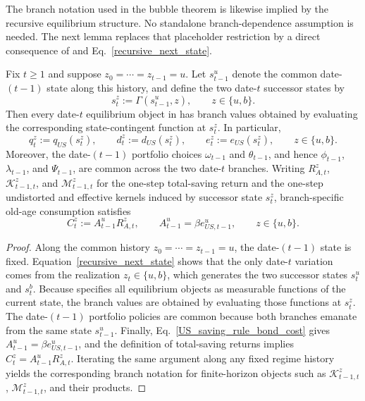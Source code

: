 \documentclass{article}
\begin{document}
The branch notation used in the bubble theorem is likewise implied by the recursive equilibrium structure. No standalone branch-dependence assumption is needed. The next lemma replaces that placeholder restriction by a direct consequence of  and Eq.~\eqref{recursive_next_state}.

\begin{lem}\label{lem_branch_reduction}\label{ass_switch_dependence}
Fix $t\ge 1$ and suppose $z_0=\cdots=z_{t-1}=u$. Let $s_{t-1}^u$ denote the common date-$(t-1)$ state along this history, and define the two date-$t$ successor states by
\[
s_t^z:=\Gamma(s_{t-1}^u,z),
\qquad
z\in\{u,b\}.
\]
Then every date-$t$ equilibrium object in  has branch values obtained by evaluating the corresponding state-contingent function at $s_t^z$. In particular,
\[
q_t^z:=q_{US}(s_t^z),
\qquad
d_t^z:=d_{US}(s_t^z),
\qquad
e_t^z:=e_{US}(s_t^z),
\qquad
z\in\{u,b\}.
\]
Moreover, the date-$(t-1)$ portfolio choices $\omega_{t-1}$ and $\theta_{t-1}$, and hence $\phi_{t-1}$, $\lambda_{t-1}$, and $\Psi_{t-1}$, are common across the two date-$t$ branches. Writing $R_{A,t}^z$, $\mathcal K_{t-1,t}^z$, and $\mathcal M_{t-1,t}^z$ for the one-step total-saving return and the one-step undistorted and effective kernels induced by successor state $s_t^z$, branch-specific old-age consumption satisfies
\[
C_t^z:=A_{t-1}^uR_{A,t}^z,
\qquad
A_{t-1}^u=\beta e_{US,t-1}^u,
\qquad
z\in\{u,b\}.
\]
\end{lem}

\begin{proof}
Along the common history $z_0=\cdots=z_{t-1}=u$, the date-$(t-1)$ state is fixed. Equation~\eqref{recursive_next_state} shows that the only date-$t$ variation comes from the realization $z_t\in\{u,b\}$, which generates the two successor states $s_t^u$ and $s_t^b$. Because  specifies all equilibrium objects as measurable functions of the current state, the branch values are obtained by evaluating those functions at $s_t^z$. The date-$(t-1)$ portfolio policies are common because both branches emanate from the same state $s_{t-1}^u$. Finally, Eq.~\eqref{US_saving_rule_bond_cost} gives $A_{t-1}^u=\beta e_{US,t-1}^u$, and the definition of total-saving returns implies $C_t^z=A_{t-1}^uR_{A,t}^z$. Iterating the same argument along any fixed regime history yields the corresponding branch notation for finite-horizon objects such as $\mathcal K_{t-1,t}^z$, $\mathcal M_{t-1,t}^z$, and their products.
\end{proof}
\end{document}
